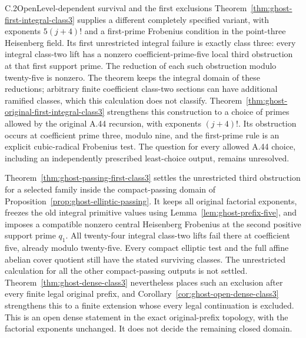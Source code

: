 \begin{result}{C.2}{Open}{Level-dependent survival and the first exclusions}
Theorem~\ref{thm:ghost-first-integral-class3} supplies a
different completely specified variant, with exponents
\(5(j+4)!\) and a first-prime Frobenius condition in the
point-three Heisenberg field. Its first unrestricted integral
failure is exactly class three: every integral class-two lift
has a nonzero coefficient-prime-five local third obstruction
at that first support prime. The reduction of each such
obstruction modulo twenty-five is nonzero. The theorem keeps
the integral domain of these reductions; arbitrary finite
coefficient class-two sections can have additional ramified
classes, which this calculation does not classify.
Theorem~\ref{thm:ghost-original-first-integral-class3}
strengthens this construction to a choice of primes allowed
by the original A.44 recursion, with exponents \((j+4)!\).
Its obstruction occurs at coefficient prime three, modulo
nine, and the first-prime rule is an explicit cubic-radical
Frobenius test. The question for every allowed A.44 choice,
including an independently prescribed least-choice output,
remains unresolved.

Theorem~\ref{thm:ghost-passing-first-class3} settles
the unrestricted third obstruction for a selected family
inside the compact-passing domain of
Proposition~\ref{prop:ghost-elliptic-passing}. It keeps
all original factorial exponents, freezes the old
integral primitive values using
Lemma~\ref{lem:ghost-prefix-five}, and imposes a
compatible nonzero central Heisenberg Frobenius at
the second positive support prime \(q_1\).
All twenty-four integral class-two lifts fail there
at coefficient five, already modulo twenty-five.
Every compact elliptic test and the full affine
abelian cover quotient still have the stated surviving
classes. The unrestricted calculation for all the
other compact-passing outputs is not settled.
Theorem~\ref{thm:ghost-dense-class3} nevertheless places such
an exclusion after every finite legal original prefix,
and Corollary~\ref{cor:ghost-open-dense-class3} strengthens
this to a finite extension whose every legal continuation
is excluded. This is an open dense statement in the exact
original-prefix topology, with the factorial exponents
unchanged. It does not decide the remaining closed domain.


\end{result}
